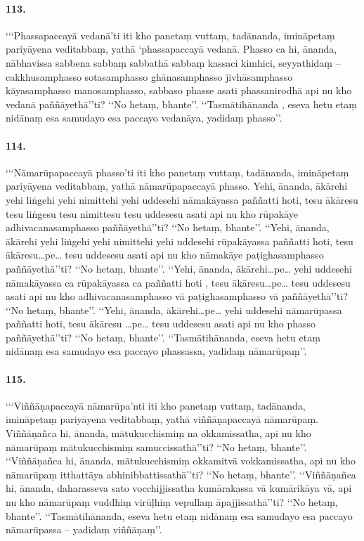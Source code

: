 \paragraph{113.} ‘‘‘Phassapaccayā vedanā’ti iti kho panetaṃ vuttaṃ, tadānanda, imināpetaṃ pariyāyena veditabbaṃ, yathā ‘phassapaccayā vedanā. Phasso ca hi, ānanda, nābhavissa sabbena sabbaṃ sabbathā sabbaṃ kassaci kimhici, seyyathidaṃ – cakkhusamphasso sotasamphasso ghānasamphasso jivhāsamphasso kāyasamphasso manosamphasso, sabbaso phasse asati phassanirodhā api nu kho vedanā paññāyethā’’ti? ‘‘No hetaṃ, bhante’’. ‘‘Tasmātihānanda , eseva hetu etaṃ nidānaṃ esa samudayo esa paccayo vedanāya, yadidaṃ phasso’’.

\paragraph{114.} ‘‘‘Nāmarūpapaccayā phasso’ti iti kho panetaṃ vuttaṃ, tadānanda, imināpetaṃ pariyāyena veditabbaṃ, yathā nāmarūpapaccayā phasso. Yehi, ānanda, ākārehi yehi liṅgehi yehi nimittehi yehi uddesehi nāmakāyassa paññatti hoti, tesu ākāresu tesu liṅgesu tesu nimittesu tesu uddesesu asati api nu kho rūpakāye adhivacanasamphasso paññāyethā’’ti? ‘‘No hetaṃ, bhante’’. ‘‘Yehi, ānanda, ākārehi yehi liṅgehi yehi nimittehi yehi uddesehi rūpakāyassa paññatti hoti, tesu ākāresu…pe… tesu uddesesu asati api nu kho nāmakāye paṭighasamphasso paññāyethā’’ti? ‘‘No hetaṃ, bhante’’. ‘‘Yehi, ānanda, ākārehi…pe… yehi uddesehi nāmakāyassa ca rūpakāyassa ca paññatti hoti , tesu ākāresu…pe… tesu uddesesu asati api nu kho adhivacanasamphasso vā paṭighasamphasso vā paññāyethā’’ti? ‘‘No hetaṃ, bhante’’. ‘‘Yehi, ānanda, ākārehi…pe… yehi uddesehi nāmarūpassa paññatti hoti, tesu ākāresu …pe… tesu uddesesu asati api nu kho phasso paññāyethā’’ti? ‘‘No hetaṃ, bhante’’. ‘‘Tasmātihānanda, eseva hetu etaṃ nidānaṃ esa samudayo esa paccayo phassassa, yadidaṃ nāmarūpaṃ’’.

\paragraph{115.} ‘‘‘Viññāṇapaccayā nāmarūpa’nti iti kho panetaṃ vuttaṃ, tadānanda, imināpetaṃ pariyāyena veditabbaṃ, yathā viññāṇapaccayā nāmarūpaṃ. Viññāṇañca hi, ānanda, mātukucchismiṃ na okkamissatha, api nu kho nāmarūpaṃ mātukucchismiṃ samuccissathā’’ti? ‘‘No hetaṃ, bhante’’. ‘‘Viññāṇañca hi, ānanda, mātukucchismiṃ okkamitvā vokkamissatha, api nu kho nāmarūpaṃ itthattāya abhinibbattissathā’’ti? ‘‘No hetaṃ, bhante’’. ‘‘Viññāṇañca hi, ānanda, daharasseva sato vocchijjissatha kumārakassa vā kumārikāya vā, api nu kho nāmarūpaṃ vuddhiṃ virūḷhiṃ vepullaṃ āpajjissathā’’ti? ‘‘No hetaṃ, bhante’’. ‘‘Tasmātihānanda, eseva hetu etaṃ nidānaṃ esa samudayo esa paccayo nāmarūpassa – yadidaṃ viññāṇaṃ’’.

